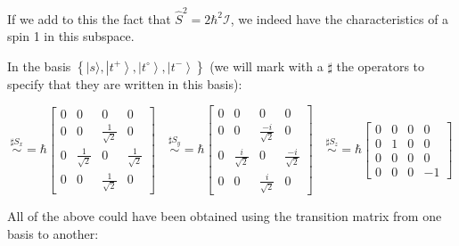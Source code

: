 \documentclass{article}
\begin{document}
\begin{enumerate}
\begin{enumerate}
{        If we add to this the fact that \(\hat{S}^{2} = 2 \hbar^{2} \mathcal{I}\), we indeed have the characteristics of a spin 1 in this subspace.

        In the basis \(\left\{|s\rangle, \left|t^{+}\right\rangle, \left|t^{\circ}\right\rangle, \left|t^{-}\right\rangle\right\}\) (we will mark with a \(\sharp\) the operators to specify that they are written in this basis):

        \[
        \stackrel{\sharp S_{x}}{\sim} = \hbar \left[\begin{array}{cccc}
        0 & 0 & 0 & 0 \\
        0 & 0 & \frac{1}{\sqrt{2}} & 0 \\
        0 & \frac{1}{\sqrt{2}} & 0 & \frac{1}{\sqrt{2}} \\
        0 & 0 & \frac{1}{\sqrt{2}} & 0
        \end{array}\right] \quad \stackrel{\sharp S_{y}}{\sim} = \hbar \left[\begin{array}{cccc}
        0 & 0 & 0 & 0 \\
        0 & 0 & \frac{-i}{\sqrt{2}} & 0 \\
        0 & \frac{i}{\sqrt{2}} & 0 & \frac{-i}{\sqrt{2}} \\
        0 & 0 & \frac{i}{\sqrt{2}} & 0
        \end{array}\right] \quad \stackrel{\sharp S_{z}}{\sim} = \hbar \left[\begin{array}{cccc}
        0 & 0 & 0 & 0 \\
        0 & 1 & 0 & 0 \\
        0 & 0 & 0 & 0 \\
        0 & 0 & 0 & -1
        \end{array}\right]
        \]

        All of the above could have been obtained using the transition matrix from one basis to another:

}
\end{enumerate}
\end{enumerate}
\end{document}
